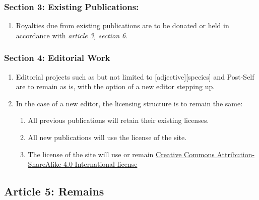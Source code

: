 \hypertarget{section-3-existing-publications}{%
\subsubsection*{Section 3: Existing Publications:}\label{section-3-existing-publications}}

\begin{enumerate}
\def\labelenumi{\arabic{enumi}.}
\tightlist
\item
  Royalties due from existing publications are to be donated or held in accordance with \emph{article 3, section 6}.
\end{enumerate}

\hypertarget{section-4-editorial-work}{%
\subsubsection*{Section 4: Editorial Work}\label{section-4-editorial-work}}

\begin{enumerate}
\def\labelenumi{\arabic{enumi}.}
\tightlist
\item
  Editorial projects such as but not limited to {[}adjective{]}{[}species{]} and Post-Self are to remain as is, with the option of a new editor stepping up.
\item
  In the case of a new editor, the licensing structure is to remain the same:

  \begin{enumerate}
  \def\labelenumii{\arabic{enumii}.}
  \tightlist
  \item
    All previous publications will retain their existing licenses.
  \item
    All new publications will use the license of the site.
  \item
    The license of the site will use or remain \href{https://creativecommons.org/licenses/by-sa/4.0/}{Creative Commons Attribution-ShareAlike 4.0 International license}
  \end{enumerate}
\end{enumerate}

\hypertarget{article-5-remains}{%
\subsection*{Article 5: Remains}\label{article-5-remains}}

